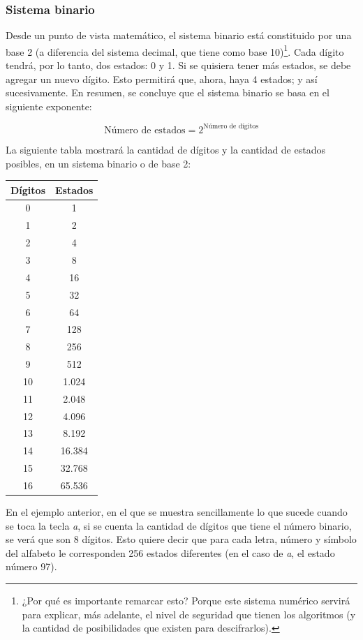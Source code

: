 \documentclass[12pt,a4paper,twoside]{book}
\begin{document}
\subsubsection{Sistema binario}
Desde un punto de vista matemático, el sistema binario está constituido por una base 2 (a diferencia del sistema decimal, que tiene como base 10)\footnote{¿Por qué es importante remarcar esto? Porque este sistema numérico servirá para explicar, más adelante, el nivel de seguridad que tienen los algoritmos (y la cantidad de posibilidades que existen para descifrarlos).}. Cada dígito tendrá, por lo tanto, dos estados: 0 y 1. Si se quisiera tener más estados, se debe agregar un nuevo dígito. Esto permitirá que, ahora, haya 4 estados; y así sucesivamente. En resumen, se concluye que el sistema binario se basa en el siguiente exponente:

\[ \text{Número de estados} = 2^{\text{Número de dígitos}}
\]

La siguiente tabla mostrará la cantidad de dígitos y la cantidad de estados posibles, en un sistema binario o de base 2:

\begin{center}
\begin{longtable}{|c|c|}
\hline 
\textbf{Dígitos} & \textbf{Estados} \\ 
\hline 
0 & 1 \\ 
\hline 
1 & 2 \\ 
\hline 
2 & 4 \\ 
\hline 
3 & 8 \\ 
\hline 
4 & 16 \\ 
\hline 
5 & 32 \\ 
\hline 
6 & 64 \\ 
\hline 
7 & 128 \\ 
\hline 
8 & 256 \\ 
\hline 
9 & 512 \\ 
\hline 
10 & 1.024 \\ 
\hline 
11 & 2.048 \\ 
\hline 
12 & 4.096 \\ 
\hline 
13 & 8.192 \\ 
\hline 
14 & 16.384 \\ 
\hline 
15 & 32.768 \\ 
\hline 
16 & 65.536 \\ 
\hline 
\end{longtable}
\end{center}

En el ejemplo anterior, en el que se muestra sencillamente lo que sucede cuando se toca la tecla \textit{a}, si se cuenta la cantidad de dígitos que tiene el número binario, se verá que son 8 dígitos. Esto quiere decir que para cada letra, número y símbolo del alfabeto le corresponden 256 estados diferentes (en el caso de \textit{a}, el estado número 97).
\end{document}
